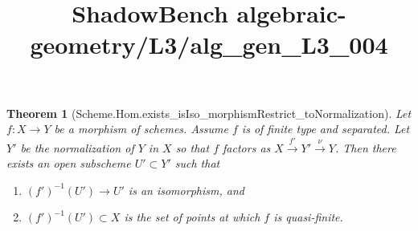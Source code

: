 \documentclass{article}
\title{ShadowBench algebraic-geometry/L3/alg\_gen\_L3\_004}
\newtheorem{theorem}{Theorem}
\begin{document}
\maketitle

\begin{theorem}[Scheme.Hom.exists_isIso_morphismRestrict_toNormalization]
    Let $f: X \to Y$ be a morphism of schemes. Assume $f$ is of finite type and separated. Let $Y'$ be the normalization of $Y$ in $X$ so that $f$ factors as $X \xrightarrow{f'} Y' \xrightarrow{\nu} Y$. Then there exists an open subscheme $U' \subset Y'$ such that
    \begin{enumerate}
        \item $(f')^{-1}(U') \to U'$ is an isomorphism, and
        \item $(f')^{-1}(U') \subset X$ is the set of points at which $f$ is quasi-finite.
    \end{enumerate}
\end{theorem}
\end{document}
